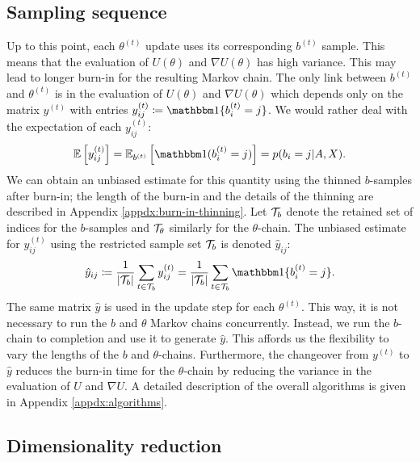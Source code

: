\subsection{Sampling sequence}
\label{s:ss}

Up to this point, each $\theta^{(t)}$ update uses its corresponding $b^{(t)}$ sample. This means that the evaluation of $U(\theta)$ and $\nabla U(\theta)$ has high variance. This may lead to longer burn-in for the resulting Markov chain. The only link between $b^{(t)}$ and $\theta^{(t)}$ is in the evaluation of $U(\theta)$ and $\nabla U(\theta)$ which depends only on the matrix $y^{(t)}$ with entries $y_{ij}^{(t)} \coloneqq \one\{b_i^{(t)} = j\}$. We would rather deal with the expectation of each $y_{ij}^{(t)}$:
%
\begin{equation}
	\Expect \left[ y_{ij}^{(t)} \right] = \Expect_{b^{(t)}} \left[ \one(b_{i}^{(t)} = j) \right]
	= p(b_i = j | A, X).
\end{equation}
%
We can obtain an unbiased estimate for this quantity using 
the thinned $b$-samples after burn-in; the length of the
burn-in and the details of the thinning are described
in Appendix \ref{appdx:burn-in-thinning}.
Let $\mathcal{T}_b$  denote the retained set of indices 
for the $b$-samples and $\mathcal{T}_\theta$ similarly for the $\theta$-chain. 
The unbiased estimate for $y_{ij}^{(t)}$ using the 
restricted sample set $\mathcal{T}_b$ is denoted $\hat{y}_{ij}$:
%
\begin{equation}
	\hat{y}_{ij} \coloneqq \frac{1}{|\Tcal_b|} \sum_{t \in \Tcal_b} y_{ij}^{(t)} = \frac{1}{|\Tcal_b|} \sum_{t \in \Tcal_b} \one\{b_i^{(t)} = j\}.
\end{equation}
%
The same matrix $\hat{y}$ is used in the update step
for each $\theta^{(t)}$.
This way, it is not necessary to run the $b$ and $\theta$ Markov chains 
concurrently. Instead, we run the $b$-chain to completion and use it 
to generate $\hat{y}$. This affords us the flexibility to vary the 
lengths of the $b$ and $\theta$-chains. Furthermore, the changeover 
from $y^{(t)}$ to $\hat{y}$ reduces the burn-in time for 
the $\theta$-chain by reducing the variance in the evaluation 
of $U$ and $\nabla U$. A detailed description of the overall 
algorithms is given in Appendix \ref{appdx:algorithms}.

\subsection{Dimensionality reduction}
\label{sec:dim-reduction}

